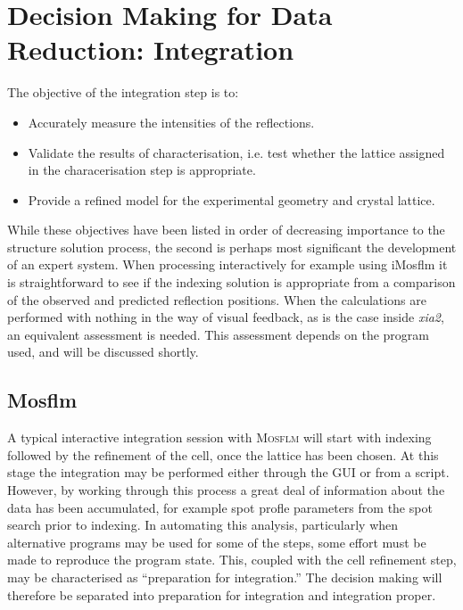 \documentclass[preprint,pdf]{iucr}
\begin{document}

\section{Decision Making for Data Reduction: Integration}

The objective of the integration step is to:

\begin{itemize}
\item{Accurately measure the intensities of the reflections.}
\item{Validate the results of characterisation, i.e. test whether the
    lattice assigned in the characerisation step is appropriate.}
\item{Provide a refined model for the experimental geometry and
    crystal lattice.}
\end{itemize}

\noindent
While these objectives have been listed in order of decreasing
importance to the structure solution process, the second is perhaps
most significant the development of an expert system. When processing
interactively for example using iMosflm it is
straightforward to see if the indexing solution is appropriate from a
comparison of the observed and predicted reflection positions. When
the calculations are
performed with nothing in the way of visual feedback,
as is the case inside \emph{xia2}, an equivalent assessment is
needed. This assessment depends on the program used, and will be
discussed shortly.

\subsection{Mosflm}

A typical interactive integration session with \textsc{Mosflm} will start with
indexing followed by the refinement of the cell, once the lattice has
been chosen. At this stage the integration may be performed either
through the GUI or from a script. However, by working through this
process a great deal of information about the data has been
accumulated, for example spot profle parameters from the spot search
prior to indexing. In automating this analysis, particularly when
alternative programs may be used for some of the steps, some effort
must be made to reproduce the program state. This, coupled with the
cell refinement step, may be characterised as ``preparation for
integration.'' The decision making will therefore be separated into
preparation for integration and integration proper.
\end{document}
